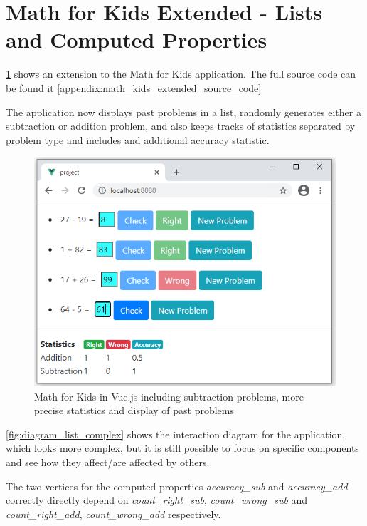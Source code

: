\section{Math for Kids Extended - Lists and Computed Properties}

\ref{fig:eval_image_list_complex} shows an extension to the Math for Kids application. The full source code can be found it \ref{appendix:math_kids_extended_source_code}

The application now displays past problems in a list, randomly generates either a subtraction or addition problem, and also keeps tracks of statistics separated by problem type and includes and additional accuracy statistic.

\begin{figure}[H]
    \includegraphics[width=\textwidth]{images/math_for_kids_own_complex.png}
     \caption{Math for Kids in Vue.js including subtraction problems, more precise statistics and display of past problems }
     \label{fig:eval_image_list_complex}
\end{figure}

\ref{fig:diagram_list_complex} shows the interaction diagram for the application, which looks more complex, but it is still possible to focus on specific components and see how they affect/are affected by others. 

The two vertices for the computed properties \textit{accuracy\_sub} and \textit{accuracy\_add} correctly directly depend on \textit{count\_right\_sub}, \textit{count\_wrong\_sub} and \textit{count\_right\_add}, \textit{count\_wrong\_add} respectively.

